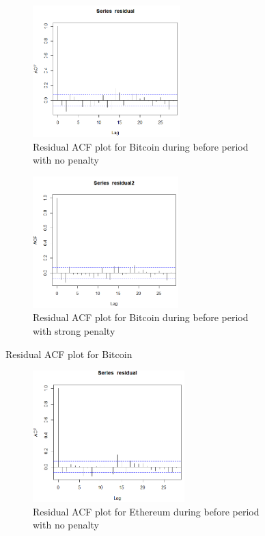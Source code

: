 \begin{spacing}{1.5}
\begin{figure}[h]
  \begin{subfigure}{.49\textwidth}
    \centering
  \includegraphics[height=2in]{btcbefno.PNG}
  \caption{ Residual ACF plot for Bitcoin during before period with no penalty}
  \end{subfigure}
  \begin{subfigure}{.49\textwidth}
    \centering
  \includegraphics[height=2in]{btcbefstrong.PNG}
  \caption{ Residual ACF plot for Bitcoin during before period with strong penalty}
  \end{subfigure}
  \caption{Residual ACF plot for Bitcoin}
\end{figure}

\begin{figure}[h]
  \begin{subfigure}{.49\textwidth}
    \centering

\includegraphics[height=2in]{ethbefno.PNG}
\caption{ Residual ACF plot for Ethereum during before period with no penalty}
  \end{subfigure}
  \begin{subfigure}{.49\textwidth}
  \centering


\end{subfigure}
\end{figure}
\end{spacing}

